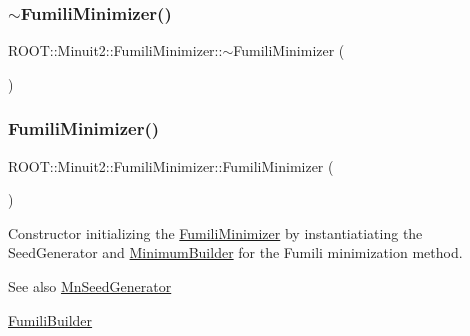 \subsubsection{\texorpdfstring{$\sim$FumiliMinimizer()}{~FumiliMinimizer()}\hspace{0.1cm}{\footnotesize\ttfamily [1/2]}}
{\footnotesize\ttfamily R\+O\+O\+T\+::\+Minuit2\+::\+Fumili\+Minimizer\+::$\sim$\+Fumili\+Minimizer (\begin{DoxyParamCaption}{ }\end{DoxyParamCaption})\hspace{0.3cm}{\ttfamily [inline]}}

\mbox{\label{classROOT_1_1Minuit2_1_1FumiliMinimizer_af33036073afd0161dbe9fd2fe0866575}} 
\subsubsection{\texorpdfstring{FumiliMinimizer()}{FumiliMinimizer()}\hspace{0.1cm}{\footnotesize\ttfamily [2/2]}}
{\footnotesize\ttfamily R\+O\+O\+T\+::\+Minuit2\+::\+Fumili\+Minimizer\+::\+Fumili\+Minimizer (\begin{DoxyParamCaption}{ }\end{DoxyParamCaption})\hspace{0.3cm}{\ttfamily [inline]}}

Constructor initializing the \mbox{\hyperlink{classROOT_1_1Minuit2_1_1FumiliMinimizer}{Fumili\+Minimizer}} by instantiatiating the Seed\+Generator and \mbox{\hyperlink{classROOT_1_1Minuit2_1_1MinimumBuilder}{Minimum\+Builder}} for the Fumili minimization method.

\begin{DoxySeeAlso}{See also}
\mbox{\hyperlink{classROOT_1_1Minuit2_1_1MnSeedGenerator}{Mn\+Seed\+Generator}}

\mbox{\hyperlink{classROOT_1_1Minuit2_1_1FumiliBuilder}{Fumili\+Builder}} 
\end{DoxySeeAlso}
\mbox{\label{classROOT_1_1Minuit2_1_1FumiliMinimizer_a2e482171de26d153b98228aa41adee3e}} 
